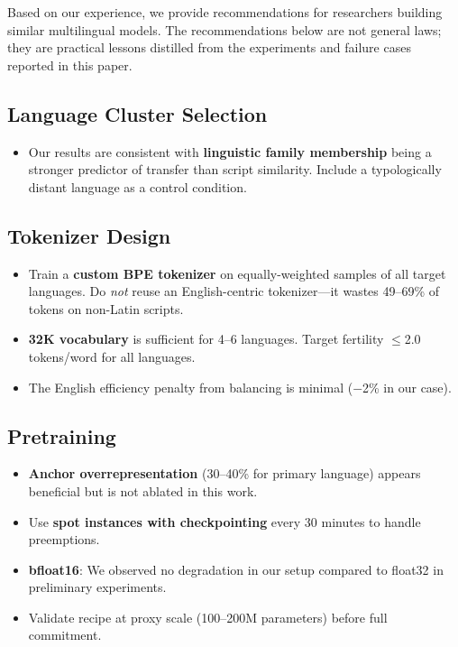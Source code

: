 \documentclass[10pt,twocolumn]{article}
\begin{document}
Based on our experience, we provide recommendations for researchers building similar multilingual models. The recommendations below are not general laws; they are practical lessons distilled from the experiments and failure cases reported in this paper.

\subsection{Language Cluster Selection}

\begin{itemize}
    \item Our results are consistent with \textbf{linguistic family membership} being a stronger predictor of transfer than script similarity. Include a typologically distant language as a control condition.
\end{itemize}

\subsection{Tokenizer Design}

\begin{itemize}
    \item Train a \textbf{custom BPE tokenizer} on equally-weighted samples of all target languages. Do \emph{not} reuse an English-centric tokenizer---it wastes 49--69\% of tokens on non-Latin scripts.
    \item \textbf{32K vocabulary} is sufficient for 4--6 languages. Target fertility $\leq$2.0 tokens/word for all languages.
    \item The English efficiency penalty from balancing is minimal ($-$2\% in our case).
\end{itemize}

\subsection{Pretraining}

\begin{itemize}
    \item \textbf{Anchor overrepresentation} (30--40\% for primary language) appears beneficial but is not ablated in this work.
    \item Use \textbf{spot instances with checkpointing} every 30 minutes to handle preemptions.
    \item \textbf{bfloat16}: We observed no degradation in our setup compared to float32 in preliminary experiments.
    \item Validate recipe at proxy scale (100--200M parameters) before full commitment.
\end{itemize}
\end{document}
